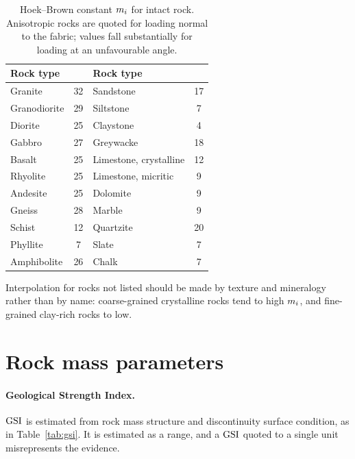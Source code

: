 \begin{table}[htbp]
\caption{Hoek--Brown constant $\mi$ for intact rock. Anisotropic rocks are
quoted for loading normal to the fabric; values fall substantially for loading
at an unfavourable angle.}
\label{tab:mi}
\centering
\small
\begin{tabularx}{\textwidth}{X c X c}
\toprule
\textbf{Rock type} & \boldmath{$\mi$} & \textbf{Rock type} & \boldmath{$\mi$} \\
\midrule
Granite            & 32 & Sandstone          & 17 \\
Granodiorite       & 29 & Siltstone          & 7 \\
Diorite            & 25 & Claystone          & 4 \\
Gabbro             & 27 & Greywacke          & 18 \\
Basalt             & 25 & Limestone, crystalline & 12 \\
Rhyolite           & 25 & Limestone, micritic    & 9 \\
Andesite           & 25 & Dolomite           & 9 \\
Gneiss             & 28 & Marble             & 9 \\
Schist             & 12 & Quartzite          & 20 \\
Phyllite           & 7  & Slate              & 7 \\
Amphibolite        & 26 & Chalk              & 7 \\
\bottomrule
\end{tabularx}
\end{table}

Interpolation for rocks not listed should be made by texture and mineralogy
rather than by name: coarse-grained crystalline rocks tend to high $\mi$, and
fine-grained clay-rich rocks to low.

\section{Rock mass parameters}
\label{sec:rock-mass-parameters-app}

\paragraph{Geological Strength Index.}
$\mathrm{GSI}$ is estimated from rock mass structure and discontinuity surface
condition, as in Table~\ref{tab:gsi}. It is estimated as a range, and
a $\mathrm{GSI}$ quoted to a single unit misrepresents the evidence.

